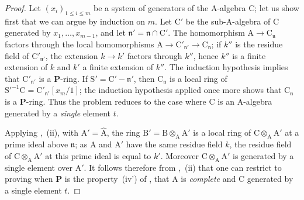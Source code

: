 \begin{proof}
Let $(x_i)_{1\leqslant i\leqslant m}$ be a system of generators of the $\mathrm{A}$-algebra $\mathrm{C}$; let us show first that we can argue by induction on $m$.
Let $\mathrm{C}'$ be the sub-$\mathrm{A}$-algebra of $\mathrm{C}$ generated by $x_1,\ldots,x_{m-1}$, and let $\mathfrak{n}'=\mathfrak{n}\cap\mathrm{C}'$.
The homomorphism $\mathrm{A}\to\mathrm{C}_\mathfrak{n}$ factors through the local homomorphisms $\mathrm{A}\to\mathrm{C}'_{\mathfrak{n}'}\to\mathrm{C}_\mathfrak{n}$; if $k''$ is the residue field of $\mathrm{C}'_{\mathfrak{n}'}$, the extension $k\to k'$ factors through $k''$, hence $k''$ is a finite extension of $k$ and $k'$ a finite extension of $k''$.
The induction hypothesis implies that $\mathrm{C}'_{\mathfrak{n}'}$ is a $\boldsymbol{P}$-ring. If $\mathrm{S}'=\mathrm{C}'-\mathfrak{n}'$, then $\mathrm{C}_\mathfrak{n}$ is a local ring of $\mathrm{S}'^{-1}\mathrm{C}=\mathrm{C}'_{\mathfrak{n}'}[x_m/1]$; the induction hypothesis applied once more shows that $\mathrm{C}_\mathfrak{n}$ is a $\boldsymbol{P}$-ring. Thus the problem reduces to the case where $\mathrm{C}$ is an $\mathrm{A}$-algebra generated by a \emph{single} element $t$.

Applying ,~(ii), with $\mathrm{A}'=\widehat{\mathrm{A}}$, the ring $\mathrm{B}'=\mathrm{B}\otimes_\mathrm{A}\mathrm{A}'$ is a local ring of $\mathrm{C}\otimes_\mathrm{A}\mathrm{A}'$ at a prime ideal above $\mathfrak{n}$; as $\mathrm{A}$ and $\mathrm{A}'$ have the same residue field $k$, the residue field of $\mathrm{C}\otimes_\mathrm{A}\mathrm{A}'$ at this prime ideal is equal to $k'$.
Moreover $\mathrm{C}\otimes_\mathrm{A}\mathrm{A}'$ is generated by a single element over $\mathrm{A}'$.
It follows therefore from ,~(ii) that one can restrict to proving  when $\boldsymbol{P}$ is the property~(iv') of , that $\mathrm{A}$ is \emph{complete} and $\mathrm{C}$ generated by a single element $t$.


\end{proof}
